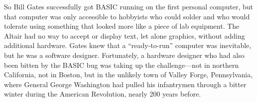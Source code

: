 So Bill Gates successfully got BASIC running on the first personal computer, but that computer was only
accessible to hobbyists who could solder and who would tolerate using
something that looked more like a piece of lab equipment.  The Altair had no way
to accept or display text, let alone graphics, without adding additional
hardware. 
Gates knew that a ``ready-to-run'' computer was inevitable, but he was a
software designer.  Fortunately, a hardware designer who had also been
bitten by the BASIC bug was taking up the challenge---not in northern
California, not in Boston, but in the unlikely town of Valley Forge,
Pennsylvania, where General George Washington had pulled his infantrymen
through a bitter winter during the American Revolution, nearly 200 years before.



